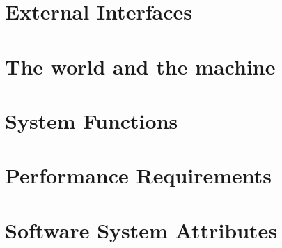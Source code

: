 \section{External Interfaces}
	
\section{The world and the machine}
	
\newpage
\section{System Functions}
	\label{sec:system_functions}
	
\newpage
\section{Performance Requirements}
	
\section{Software System Attributes}
	